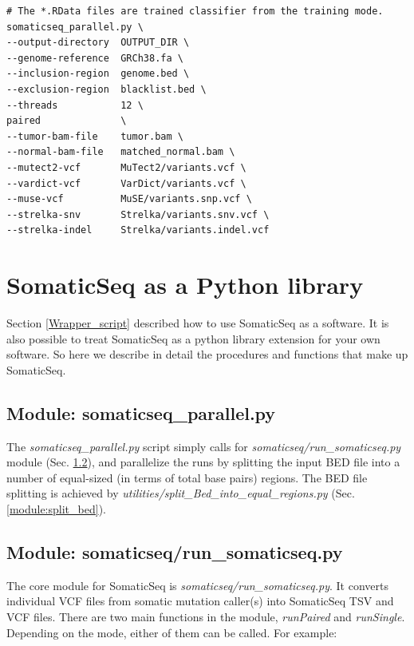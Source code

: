 \documentclass[10pt,letterpaper]{article}
\begin{document}
\begin{sloppypar}
\begin{lstlisting}
# The *.RData files are trained classifier from the training mode.
somaticseq_parallel.py \
--output-directory  OUTPUT_DIR \
--genome-reference  GRCh38.fa \
--inclusion-region  genome.bed \
--exclusion-region  blacklist.bed \
--threads           12 \
paired              \
--tumor-bam-file    tumor.bam \
--normal-bam-file   matched_normal.bam \
--mutect2-vcf       MuTect2/variants.vcf \
--vardict-vcf       VarDict/variants.vcf \
--muse-vcf          MuSE/variants.snp.vcf \
--strelka-snv       Strelka/variants.snv.vcf \
--strelka-indel     Strelka/variants.indel.vcf
\end{lstlisting}







\section{SomaticSeq as a Python library} \label{somaticseq_package}


Section \ref{Wrapper_script} described how to use SomaticSeq as a software. It is also possible to treat SomaticSeq as a python library extension for your own software. So here we describe in detail the procedures and functions that make up SomaticSeq. 
 

\subsection{Module: somaticseq\_parallel.py} \label{module:somaticseq_parallel}

The \emph{somaticseq\_parallel.py} script simply calls for \emph{somaticseq/run\_somaticseq.py} module (Sec. \ref{module:run_somaticseq}), and parallelize the runs by splitting the input BED file into a number of equal-sized (in terms of total base pairs) regions. The BED file splitting is achieved by \emph{utilities/split\_Bed\_into\_equal\_regions.py} (Sec. \ref{module:split_bed}).


\subsection{Module: somaticseq/run\_somaticseq.py} \label{module:run_somaticseq}

The core module for SomaticSeq is \emph{somaticseq/run\_somaticseq.py}. It converts individual VCF files from somatic mutation caller(s) into SomaticSeq TSV and VCF files. There are two main functions in the module, \emph{runPaired} and \emph{runSingle}. Depending on the mode, either of them can be called. For example:


\end{sloppypar}
\end{document}
